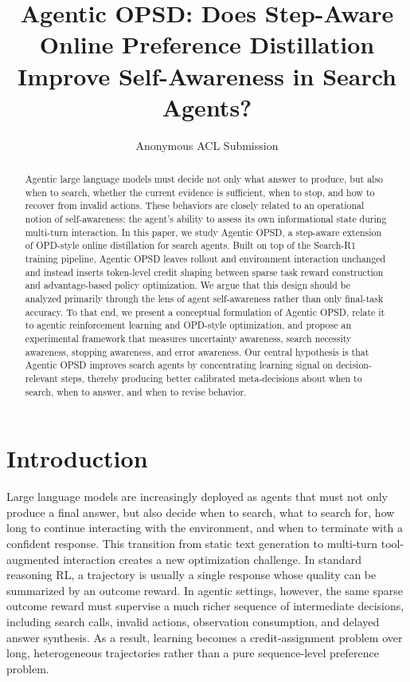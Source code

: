 \documentclass[11pt]{article}
\title{Agentic OPSD: Does Step-Aware Online Preference Distillation Improve Self-Awareness in Search Agents?}
\author{Anonymous ACL Submission}
\newcommand{\method}{Agentic OPSD}
\newcommand{\searchr}{Search-R1}
\begin{document}
\maketitle

\begin{abstract}
Agentic large language models must decide not only what answer to produce, but also when to search, whether the current evidence is sufficient, when to stop, and how to recover from invalid actions. These behaviors are closely related to an operational notion of self-awareness: the agent's ability to assess its own informational state during multi-turn interaction. In this paper, we study \method, a step-aware extension of OPD-style online distillation for search agents. Built on top of the \searchr{} training pipeline, \method{} leaves rollout and environment interaction unchanged and instead inserts token-level credit shaping between sparse task reward construction and advantage-based policy optimization. We argue that this design should be analyzed primarily through the lens of agent self-awareness rather than only final-task accuracy. To that end, we present a conceptual formulation of Agentic OPSD, relate it to agentic reinforcement learning and OPD-style optimization, and propose an experimental framework that measures uncertainty awareness, search necessity awareness, stopping awareness, and error awareness. Our central hypothesis is that Agentic OPSD improves search agents by concentrating learning signal on decision-relevant steps, thereby producing better calibrated meta-decisions about when to search, when to answer, and when to revise behavior.
\end{abstract}

\section{Introduction}
Large language models are increasingly deployed as agents that must not only produce a final answer, but also decide when to search, what to search for, how long to continue interacting with the environment, and when to terminate with a confident response. This transition from static text generation to multi-turn tool-augmented interaction creates a new optimization challenge. In standard reasoning RL, a trajectory is usually a single response whose quality can be summarized by an outcome reward. In agentic settings, however, the same sparse outcome reward must supervise a much richer sequence of intermediate decisions, including search calls, invalid actions, observation consumption, and delayed answer synthesis. As a result, learning becomes a credit-assignment problem over long, heterogeneous trajectories rather than a pure sequence-level preference problem.
\end{document}

